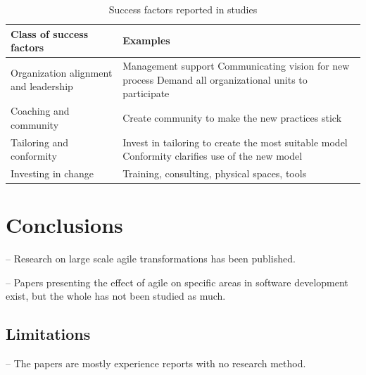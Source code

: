 \documentclass[lnbip]{svmultln}
\begin{document}
\begin{table}[h]
    \begin{tabular}{ p{} p{} }
        \toprule
        Class of success factors  & Examples   \\ \midrule
        
        \raggedright Organization alignment and leadership  &
             Management support \newline
             Communicating vision for new process \newline
             Demand all organizational units to participate \\ 
        
        \raggedright\rule{0pt}{0.4cm}Coaching and community  &
             Create community to make the new practices stick \\
        
        \raggedright\rule{0pt}{0.4cm}Tailoring and conformity  &
            Invest in tailoring to create the most suitable model \newline
            Conformity clarifies use of the new model \\
        
        \raggedright\rule{0pt}{0.4cm}Investing in change  &
            Training, consulting, physical spaces, tools \\
        \bottomrule
    \end{tabular}
    \caption{Success factors reported in studies}
    \label{table:success}
\end{table}


\section{Conclusions}
\label{sec:conclusions}

-- Research on large scale agile transformations has been published.

-- Papers presenting the effect of agile on specific areas in software
development exist, but the whole has not been studied as much.

\subsection{Limitations}

-- The papers are mostly experience reports with no research method.
\end{document}

